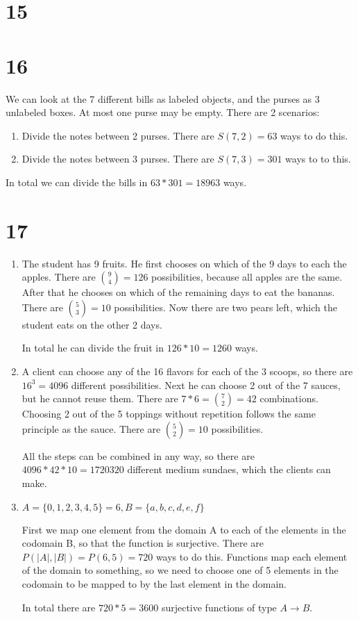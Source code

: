 \documentclass[12pt]{article}
\begin{document}
\section*{15}

\section*{16}
We can look at the 7 different bills as labeled objects, and the purses as 3 unlabeled boxes. At most one purse may be empty. There are 2 scenarios:

\begin{enumerate}
	\item
	Divide the notes between 2 purses. There are $S(7, 2) = 63$ ways to do this.
	\item
	Divide the notes between 3 purses. There are $S(7, 3) = 301$ ways to to this.
\end{enumerate}

In total we can divide the bills in $63 * 301 = 18963$ ways.

\section*{17}
\begin{enumerate}[a]
	\item %
	The student has 9 fruits. He first chooses on which of the 9 days to each the apples. There are $\binom{9}{4} = 126$ possibilities, because all apples are the same. After that he chooses on which of the remaining days to eat the bananas. There are $\binom{5}{3} = 10$ possibilities. Now there are two pears left, which the student eats on the other 2 days.

	In total he can divide the fruit in $126 * 10 = 1260$ ways.
	\item %
	A client can choose any of the 16 flavors for each of the 3 scoops, so there are $16^3 = 4096$ different possibilities. Next he can choose 2 out of the 7 sauces, but he cannot reuse them. There are $7 * 6 = \binom{7}{2} = 42$ combinations. Choosing 2 out of the 5 toppings without repetition follows the same principle as the sauce. There are $\binom{5}{2} = 10$ possibilities.

	All the steps can be combined in any way, so there are $4096 * 42 * 10 = 1720320$ different medium sundaes, which the clients can make.
	\item %
	$A = \{0, 1, 2, 3, 4, 5\} = 6, B = \{a, b, c, d, e, f\}$

	First we map one element from the domain A to each of the elements in the codomain B, so that the function is surjective. There are $P(|A|, |B|) =  P(6,5) = 720$ ways to do this. Functions map each element of the domain to something, so we need to choose one of 5 elements in the codomain to be mapped to by the last element in the domain.

	In total there are $720 * 5 = 3600$ surjective functions of type $A \rightarrow B$.
\end{enumerate}
\end{document}
